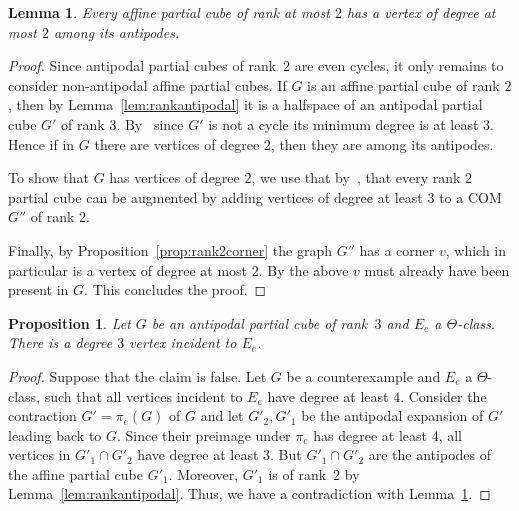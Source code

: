 \documentclass[final,11pt]{article}
\newtheorem{prop}[thm]{Proposition}%
\newtheorem{lem}[thm]{Lemma}%
\begin{document}
\begin{lem}\label{lem:LVaffinernk2}
 Every affine partial cube of rank at most $2$ has a vertex of degree at most $2$ among its antipodes.
\end{lem}
\begin{proof}
Since antipodal partial cubes of rank~$2$ are even cycles, it only remains to consider non-antipodal affine partial cubes. If $G$ is an affine partial cube of rank $2$, then by Lemma~\ref{lem:rankantipodal} it is a halfspace of an antipodal partial cube $G'$ of rank $3$. By~\cite[Theorem 7]{GKP70} since $G'$ is not a cycle its minimum degree is at least $3$. Hence if in $G$ there are vertices of degree $2$, then they are among its antipodes.

To show that $G$ has vertices of degree $2$, we use 
that by~\cite[Section 6.1]{CKP20}, that every rank $2$ partial cube can be augmented by adding vertices of degree at least $3$ to a COM $G''$ of rank $2$.

Finally, by Proposition~\ref{prop:rank2corner} the graph $G''$ has a corner $v$, which in particular is a vertex of degree at most $2$. By the above $v$ must already have been present in $G$. This concludes the proof.

%  
\end{proof}

\begin{prop}\label{prop:strongLVrnk3}
 Let $G$ be an antipodal partial cube of rank~$3$ and $E_e$ a $\Theta$-class. There is a degree $3$ vertex incident to $E_e$.
\end{prop}
\begin{proof}
 Suppose that the claim is false. Let $G$ be a counterexample and $E_e$ a $\Theta$-class, such that all vertices incident to $E_e$ have degree at least $4$. Consider the contraction $G'=\pi_e(G)$ of $G$ and let $G'_2, G'_1$ be the antipodal expansion of $G'$ leading back to $G$. Since their preimage under $\pi_e$ has degree at least $4$, all vertices in $G'_1\cap G'_2$ have degree at least $3$. But $G'_1\cap G'_2$ are the antipodes of the affine partial cube $G'_1$. Moreover, $G'_1$ is of rank~$2$ by Lemma~\ref{lem:rankantipodal}. Thus, we have a contradiction with Lemma~\ref{lem:LVaffinernk2}.
\end{proof}
\end{document}
